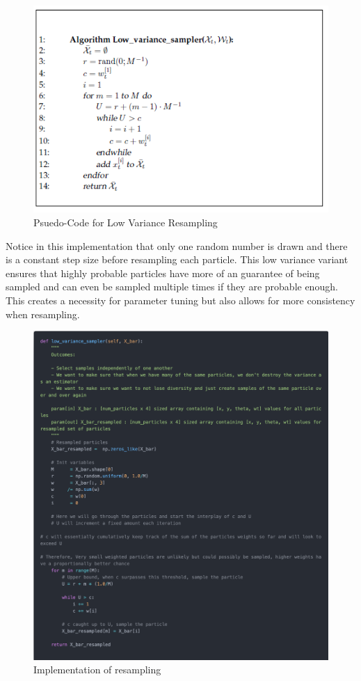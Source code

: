 \documentclass[12pt, a4paper]{article}
\begin{document}
\begin{figure}[H]
  \center
  \includegraphics{LowVarianceResampling.png}
  \caption{Psuedo-Code for Low Variance Resampling \cite{ProbRob}}
\end{figure}

\noindent Notice in this implementation that only one random number is drawn and there is a constant step size before resampling each particle. This low variance variant ensures that highly probable particles have more of an guarantee of being sampled and can even be sampled multiple times if they are probable enough. This creates a necessity for parameter tuning but also allows for more consistency when resampling.

\begin{figure}[H]
  \centering
  \includegraphics[width=0.9\linewidth]{results/resampling_2.png}
  \caption{Implementation of resampling}
\end{figure}
\end{document}
